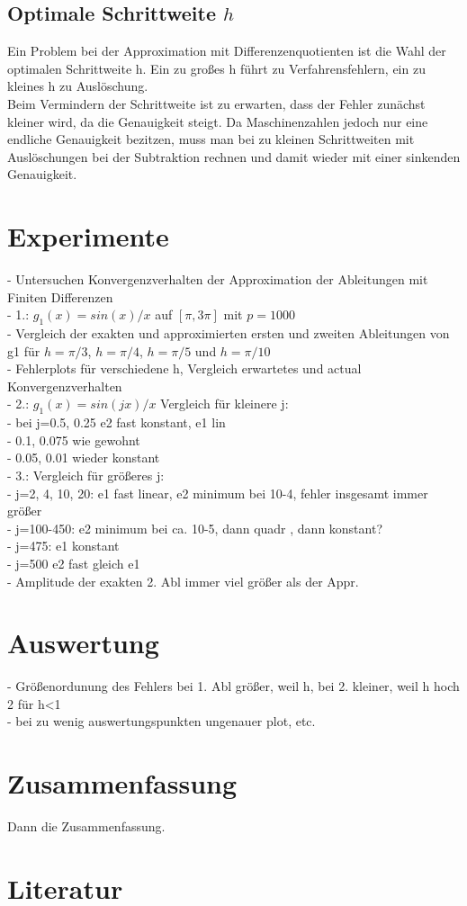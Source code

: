 \documentclass{scrartcl}
\begin{document}
\subsection{Optimale Schrittweite $h$}
\label{ssec:schrittweite}
Ein Problem bei der Approximation mit Differenzenquotienten ist die Wahl der optimalen Schrittweite h. Ein zu großes h führt zu Verfahrensfehlern, ein zu kleines h zu Auslöschung.\\
Beim Vermindern der Schrittweite ist zu erwarten, dass der Fehler zunächst kleiner wird, da die Genauigkeit steigt. Da Maschinenzahlen jedoch nur eine endliche Genauigkeit bezitzen, muss man bei zu kleinen Schrittweiten mit Auslöschungen bei der Subtraktion rechnen und damit wieder mit einer sinkenden Genauigkeit.

\pagebreak \section{Experimente}
\label{sec:experiment}
- Untersuchen Konvergenzverhalten der Approximation der Ableitungen mit Finiten Differenzen\\
- 1.: $g_1(x)=sin(x)/x$ auf $[\pi,3\pi]$ mit $p=1000$\\
- Vergleich der exakten und approximierten ersten und zweiten Ableitungen von g1 für $h = \pi/3$, $h = \pi/4$, $h = \pi/5$ und $h = \pi/10$\\
- Fehlerplots für verschiedene h, Vergleich erwartetes und actual Konvergenzverhalten\\

- 2.: $g_1(x)=sin(jx)/x$  Vergleich für kleinere j: \\
- bei j=0.5, 0.25 e2 fast konstant, e1 lin\\
- 0.1, 0.075 wie gewohnt\\
- 0.05, 0.01 wieder konstant\\
- 3.: Vergleich für größeres j:\\
- j=2, 4, 10, 20: e1 fast linear, e2 minimum bei 10-4, fehler insgesamt immer größer\\
- j=100-450: e2 minimum bei ca. 10-5, dann quadr , dann konstant?\\
- j=475: e1 konstant\\
- j=500 e2 fast gleich e1\\

- Amplitude der exakten 2. Abl immer viel größer als der Appr.

\pagebreak \section{Auswertung}
\label{sec:auswertung}
- Größenordunung des Fehlers bei 1. Abl größer, weil h, bei 2. kleiner, weil h hoch 2 für h<1\\
- bei zu wenig auswertungspunkten ungenauer plot, etc.\\

\pagebreak \section{Zusammenfassung}
\label{sec:zusammenfassung}
Dann die Zusammenfassung.

\pagebreak \section{Literatur}
\label{sec:literatur}
\end{document}
